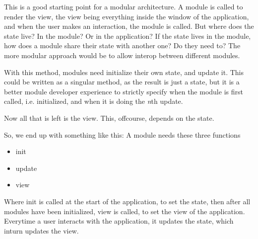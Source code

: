 \documentclass[runningheads]{llncs}
\begin{document}
This is a good starting point for a modular architecture. A module is called to
render the view, the view being everything inside the window of the application,
and when the user makes an interaction, the module is called. But where does the
state live? In the module? Or in the application? If the state lives in the
module, how does a module share their state with another one? Do they need to?
The more modular approach would be to allow interop between different modules.


With this method, modules need initialize their own state, and update it. This
could be written as a singular method, as the result is just a state, but it is
a better module developer experience to strictly specify when the module is
first called, i.e. initialized, and when it is doing the \textit{n}th update.

Now all that is left is the view. This, offcourse, depends on the state.


So, we end up with something like this:
A module needs these three functions
\begin{itemize}
  \item init
  \item update
  \item view
\end{itemize}
Where init is called at the start of the application, to set the state, then
after all modules have been initialized, view is called, to set the view of the
application. Everytime a user interacts with the application, it updates the
state, which inturn updates the view.

\end{document}
